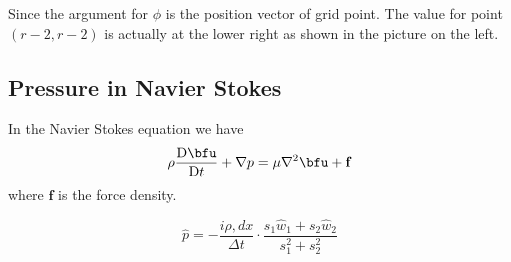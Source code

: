\documentclass[../Immersed_Boundary_Method.tex]{subfiles}
\begin{document}
Since the argument for $\phi$ is the position vector of grid point. The value for point $(r-2, r-2)$ is actually at the lower right as shown in the picture on the left. 


\newpage
\subsection{Pressure in Navier Stokes}
In the Navier Stokes equation we have 
\begin{equation}
\rho \frac{\text{D} \bfu}{\text{D} t} + \nabla p =\mu \nabla^2 \bfu + \mathbf{f}
\end{equation}
where $\mathbf{f}$ is the force density. \par
\begin{equation}
\hat{p} = -\frac{i \rho , dx}{\Delta t} \cdot \frac{s_1 \hat{w}_1 + s_2 \hat{w}_2}{s_1^2 + s_2^2}
\end{equation}
\end{document}
